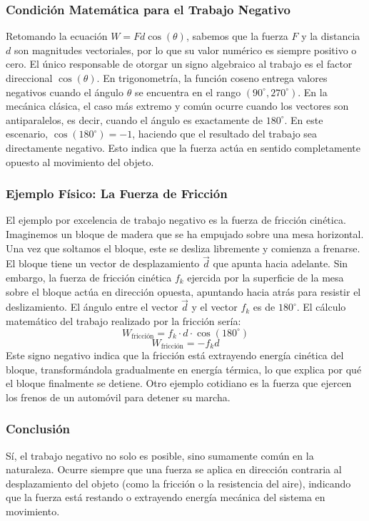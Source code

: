 \documentclass[a4paper,12pt]{article}
\begin{document}
\subsubsection*{Condición Matemática para el Trabajo Negativo}
Retomando la ecuación $W = F d \cos(\theta)$, sabemos que la fuerza $F$ y la distancia $d$ son magnitudes vectoriales, por lo que su valor numérico es siempre positivo o cero. El único responsable de otorgar un signo algebraico al trabajo es el factor direccional $\cos(\theta)$. En trigonometría, la función coseno entrega valores negativos cuando el ángulo $\theta$ se encuentra en el rango $(90^\circ, 270^\circ)$. En la mecánica clásica, el caso más extremo y común ocurre cuando los vectores son antiparalelos, es decir, cuando el ángulo es exactamente de $180^\circ$. En este escenario, $\cos(180^\circ) = -1$, haciendo que el resultado del trabajo sea directamente negativo. Esto indica que la fuerza actúa en sentido completamente opuesto al movimiento del objeto.

\subsubsection*{Ejemplo Físico: La Fuerza de Fricción}
El ejemplo por excelencia de trabajo negativo es la fuerza de fricción cinética. Imaginemos un bloque de madera que se ha empujado sobre una mesa horizontal. Una vez que soltamos el bloque, este se desliza libremente y comienza a frenarse. El bloque tiene un vector de desplazamiento $\vec{d}$ que apunta hacia adelante. Sin embargo, la fuerza de fricción cinética $f_k$ ejercida por la superficie de la mesa sobre el bloque actúa en dirección opuesta, apuntando hacia atrás para resistir el deslizamiento. 
El ángulo entre el vector $\vec{d}$ y el vector $f_k$ es de $180^\circ$.
El cálculo matemático del trabajo realizado por la fricción sería:
$$W_{\text{fricción}} = f_k \cdot d \cdot \cos(180^\circ)$$
$$W_{\text{fricción}} = - f_k d$$
Este signo negativo indica que la fricción está extrayendo energía cinética del bloque, transformándola gradualmente en energía térmica, lo que explica por qué el bloque finalmente se detiene. Otro ejemplo cotidiano es la fuerza que ejercen los frenos de un automóvil para detener su marcha.

\subsubsection*{Conclusión}
Sí, el trabajo negativo no solo es posible, sino sumamente común en la naturaleza. Ocurre siempre que una fuerza se aplica en dirección contraria al desplazamiento del objeto (como la fricción o la resistencia del aire), indicando que la fuerza está restando o extrayendo energía mecánica del sistema en movimiento.
\end{document}

